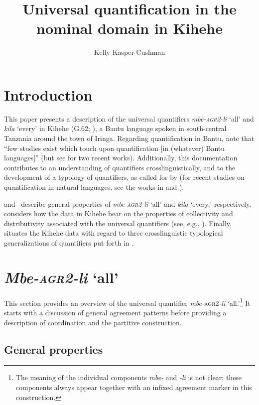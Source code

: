 \documentclass[output=paper,modfonts,nonflat]{langsci/langscibook}
\title{Universal quantification in the nominal domain in Kihehe}
\author{Kelly Kasper-Cushman\affiliation{Indiana University}}
\begin{document}
\maketitle

\section{Introduction}

This paper presents a description of the universal quantifiers \textit{mbe-\textsc{agr2}-li} `all' and \textit{kila} `every' in Kihehe (G.62; \citealt{maho09}), a Bantu language spoken in south-central Tanzania around the town of Iringa.
Regarding quantification in Bantu, \cite[383]{zerbian08} note that ``few studies exist which touch upon quantification [in (whatever) Bantu languages]'' (but see \citealt{Landman2016, Landmantoappear} for two recent works). Additionally, this documentation contributes to an understanding of quantifiers crosslinguistically, and to the development of a typology of quantifiers, as called for by \cite{Matthewson2013} (for recent studies on quantification in natural languages, see the works in \citealt{gil13, keenan12, matthewson08} and \citealt{paperno17}).

 and~ describe general properties of \textit{mbe-\textsc{agr2}-li} `all' and \textit{kila} `every,' respectively.  considers how the data in Kihehe bear on the properties of collectivity and distributivity associated with the universal quantifiers (see, e.g., \citealt{szabolcsi10}). Finally,  situates the Kihehe data with regard to three crosslinguistic typological generalizations of quantifiers put forth in \citet{Matthewson2013}. 


\section{\emph{Mbe-\textsc{agr2}-li} `all'}\label{sec:kasper:2}

This section provides an overview of the universal quantifier \emph{mbe-}\textsc{agr2}\emph{-li} `all.'\footnote{The meaning of the individual components \textit{mbe-} and \textit{-li} is not clear; these components always appear together with an infixed agreement marker in this construction.} It starts with a discussion of general agreement patterns before providing a description of coordination and the partitive construction. 

\subsection{General properties}
\end{document}
